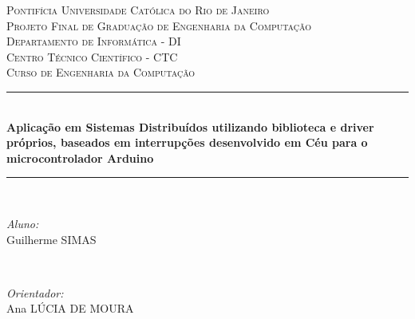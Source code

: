 \documentclass[11pt]{article}
\newcommand\textucsc[1]{\textsc{\MakeUppercase{#1}}}
\begin{document}

\begin{titlepage}

\newcommand{\HRule}{\rule{\linewidth}{0.5mm}} %

\center %
 

\textsc{\LARGE Pontifícia Universidade Católica do Rio de Janeiro}\\[1.5cm] %
\textsc{\Large Projeto Final de Graduação de Engenharia da Computação}\\[0.5cm] %

\textsc{\large Departamento de Informática - DI \\ Centro Técnico Científico - CTC \\ Curso de Engenharia da Computação}\\[0.5cm] %



\HRule \\[0.4cm]
{ \huge \bfseries Aplicação em Sistemas Distribuídos
utilizando biblioteca e driver próprios,
baseados em interrupções desenvolvido
em Céu para o microcontrolador Arduino}\\[0.4cm] %
\HRule \\[1.5cm]
 

\begin{minipage}{0.4\textwidth}
\begin{flushleft} \large
\emph{Aluno:}\\
Guilherme \textucsc{Simas} %
\end{flushleft}
\end{minipage}
~
\begin{minipage}{0.4\textwidth}
\begin{flushright} \large
\emph{Orientador:} \\
Ana \textucsc{Lúcia de Moura} %
\end{flushright}
\end{minipage}\\[4cm]


\end{titlepage}
\end{document}
